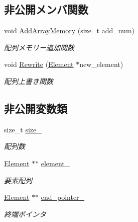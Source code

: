 \subsection*{非公開メンバ関数}
\begin{DoxyCompactItemize}
\item 
void \mbox{\hyperlink{class_interpolation_a1dc67b8338621f7504256d90e3980d0c}{Add\+Array\+Memory}} (size\+\_\+t add\+\_\+num)
\begin{DoxyCompactList}\small\item\em 配列メモリー追加関数 \end{DoxyCompactList}\item 
void \mbox{\hyperlink{class_interpolation_a5cac60c99de2fbae3b89856caad53602}{Rewrite}} (\mbox{\hyperlink{class_interpolation_a01e71544809483d7a2ee72fe0007bcb0}{Element}} $\ast$new\+\_\+element)
\begin{DoxyCompactList}\small\item\em 配列上書き関数 \end{DoxyCompactList}\end{DoxyCompactItemize}
\subsection*{非公開変数類}
\begin{DoxyCompactItemize}
\item 
size\+\_\+t \mbox{\hyperlink{class_interpolation_a5652d5fc7f1968b7f11cd5a6b36bfb5a}{size\+\_\+}}
\begin{DoxyCompactList}\small\item\em 配列数 \end{DoxyCompactList}\item 
\mbox{\hyperlink{class_interpolation_a01e71544809483d7a2ee72fe0007bcb0}{Element}} $\ast$$\ast$ \mbox{\hyperlink{class_interpolation_a2cf1221d1c0f8770231e61ad7b64a26d}{element\+\_\+}}
\begin{DoxyCompactList}\small\item\em 要素配列 \end{DoxyCompactList}\item 
\mbox{\hyperlink{class_interpolation_a01e71544809483d7a2ee72fe0007bcb0}{Element}} $\ast$$\ast$ \mbox{\hyperlink{class_interpolation_a28d232d52cf5aa84d12d073fa400c129}{end\+\_\+pointer\+\_\+}}
\begin{DoxyCompactList}\small\item\em 終端ポインタ \end{DoxyCompactList}\end{DoxyCompactItemize}


